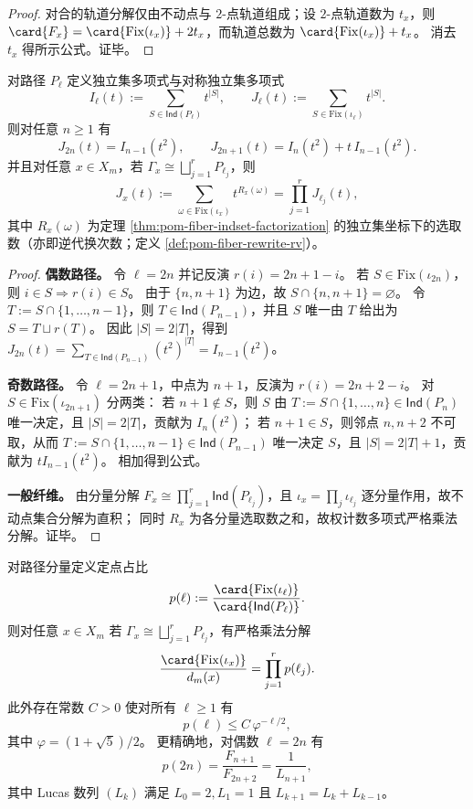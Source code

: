 \begin{proof}
对合的轨道分解仅由不动点与 \(2\)-点轨道组成；设 \(2\)-点轨道数为 \(t_x\)，则
\(
\card{F_x}=\card{\mathrm{Fix}(\iota_x)}+2t_x
\)，而轨道总数为 \(\card{\mathrm{Fix}(\iota_x)}+t_x\)。
消去 \(t_x\) 得所示公式。证毕。
\end{proof}

\begin{proposition}[对称独立集多项式的闭式与分量乘法分解]\label{prop:pom-time-reversal-symmetric-indset-polynomial}
对路径 \(P_\ell\) 定义独立集多项式与对称独立集多项式
\[
I_\ell(t):=\sum_{S\in \mathsf{Ind}(P_\ell)}t^{|S|},
\qquad
J_\ell(t):=\sum_{S\in \mathrm{Fix}(\iota_\ell)}t^{|S|}.
\]
则对任意 \(n\ge 1\) 有
\[
J_{2n}(t)=I_{n-1}(t^2),
\qquad
J_{2n+1}(t)=I_{n}(t^2)+t\,I_{n-1}(t^2).
\]
并且对任意 \(x\in X_m\)，若 \(\Gamma_x\cong\bigsqcup_{j=1}^r P_{\ell_j}\)，则
\[
J_x(t):=\sum_{\omega\in \mathrm{Fix}(\iota_x)} t^{R_x(\omega)}
=\prod_{j=1}^r J_{\ell_j}(t),
\]
其中 \(R_x(\omega)\) 为定理 \ref{thm:pom-fiber-indset-factorization} 的独立集坐标下的选取数（亦即逆代换次数；定义 \ref{def:pom-fiber-rewrite-rv}）。
\end{proposition}

\begin{proof}
\textbf{偶数路径。}
令 \(\ell=2n\) 并记反演 \(r(i)=2n+1-i\)。
若 \(S\in\mathrm{Fix}(\iota_{2n})\)，则 \(i\in S\Rightarrow r(i)\in S\)。
由于 \(\{n,n+1\}\) 为边，故 \(S\cap\{n,n+1\}=\varnothing\)。
令 \(T:=S\cap\{1,\dots,n-1\}\)，则 \(T\in\mathsf{Ind}(P_{n-1})\)，并且 \(S\) 唯一由 \(T\) 给出为 \(S=T\sqcup r(T)\)。
因此 \(|S|=2|T|\)，得到 \(J_{2n}(t)=\sum_{T\in\mathsf{Ind}(P_{n-1})}(t^2)^{|T|}=I_{n-1}(t^2)\)。
\par
\textbf{奇数路径。}
令 \(\ell=2n+1\)，中点为 \(n+1\)，反演为 \(r(i)=2n+2-i\)。
对 \(S\in\mathrm{Fix}(\iota_{2n+1})\) 分两类：
若 \(n+1\notin S\)，则 \(S\) 由 \(T:=S\cap\{1,\dots,n\}\in\mathsf{Ind}(P_n)\) 唯一决定，且 \(|S|=2|T|\)，贡献为 \(I_n(t^2)\)；
若 \(n+1\in S\)，则邻点 \(n,n+2\) 不可取，从而 \(T:=S\cap\{1,\dots,n-1\}\in\mathsf{Ind}(P_{n-1})\) 唯一决定 \(S\)，且 \(|S|=2|T|+1\)，贡献为 \(tI_{n-1}(t^2)\)。
相加得到公式。
\par
\textbf{一般纤维。}
由分量分解 \(F_x\cong \prod_{j=1}^r \mathsf{Ind}(P_{\ell_j})\)，且 \(\iota_x=\prod_j \iota_{\ell_j}\) 逐分量作用，故不动点集合分解为直积；
同时 \(R_x\) 为各分量选取数之和，故权计数多项式严格乘法分解。证毕。
\end{proof}

\begin{proposition}[时间反演定点占比的乘法律与指数稀疏]\label{prop:pom-time-reversal-fixedpoint-ratio-decay}
对路径分量定义定点占比
\[
p(\ell):=\frac{\card{\mathrm{Fix}(\iota_\ell)}}{\card{\mathsf{Ind}(P_\ell)}}.
\]
则对任意 \(x\in X_m\) 若 \(\Gamma_x\cong\bigsqcup_{j=1}^r P_{\ell_j}\)，有严格乘法分解
\[
\frac{\card{\mathrm{Fix}(\iota_x)}}{d_m(x)}=\prod_{j=1}^r p(\ell_j).
\]
此外存在常数 \(C>0\) 使对所有 \(\ell\ge 1\) 有
\[
p(\ell)\le C\,\varphi^{-\ell/2},
\]
其中 \(\varphi=(1+\sqrt5)/2\)。
更精确地，对偶数 \(\ell=2n\) 有
\[
p(2n)=\frac{F_{n+1}}{F_{2n+2}}=\frac{1}{L_{n+1}},
\]
其中 Lucas 数列 \((L_k)\) 满足 \(L_0=2,L_1=1\) 且 \(L_{k+1}=L_k+L_{k-1}\)。
\end{proposition}

